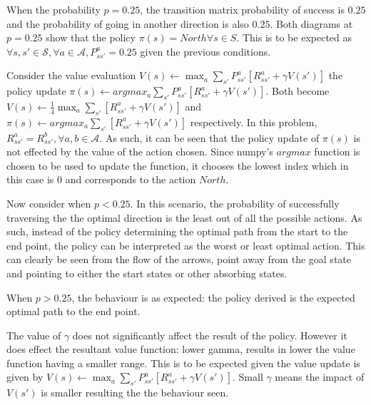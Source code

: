 \begin{landscape}
\begin{center}
\begin{tabular}{c || c  c  c}
    \end{tabular}        
\end{center}
\end{landscape}
\break

When the probability $p = 0.25$, the transition matrix probability
of success is $0.25$ and the probability of going in another direction
is also $0.25$.
Both diagrams at $p = 0.25$ show that the policy $\pi(s) = North \forall s \in S$.
This is to be expected as
$ \forall s, s' \in \mathcal{S}, \forall a \in \mathcal{A}, P^a_{ss'} = 0.25$ given 
the previous conditions. 

Consider the value evaluation 
$V(s) \leftarrow \max_a \sum_{s'} P^a_{ss'}[R^a_{ss'} + \gamma V(s')]$
the policy update $\pi(s) \leftarrow argmax_a \sum_{s'} P^a_{ss'}[R^a_{ss'} + \gamma V(s')]$.
Both become $V(s) \leftarrow \frac{1}{4}\max_a \sum_{s'} [R^a_{ss'} + \gamma V(s')]$
and $\pi(s) \leftarrow argmax_a \sum_{s'} [R^a_{ss'} + \gamma V(s')]$
respectively.
In this problem, $R^a_{ss'} = R^b_{ss'}, \forall a, b \in \mathcal{A}$. 
As such, it can be seen that the policy update of $\pi(s)$ is 
not effected by the value of the action chosen. Since numpy's
$argmax$ function is chosen to be used to update the function, 
it chooses the lowest index which in this case is $0$ and corresponds
to the action $North$. 

Now consider when $p < 0.25$.
In this scenario, the probability of successfully traversing the the
optimal direction is the least out of all the possible actions.
As such, instead of the policy determining the optimal path from the
start to the end point, the policy can be interpreted as the worst
or least optimal action. This can clearly be seen from the flow 
of the arrows, point away from the goal state and pointing to either
the start states or other absorbing states. 

When $p > 0.25$, the behaviour is as expected: the policy derived
is the expected optimal path to the end point.

The value of $\gamma$ does not significantly affect the 
result of the policy.
However it does effect the resultant value function:
lower gamma, results in lower the value function having a smaller 
range. This is to be expected given the value update is given by 
$V(s) \leftarrow \max_a \sum_{s'} P^a_{ss'}[R^a_{ss'} + \gamma V(s')]$.
Small $\gamma$ means the impact of $V(s')$ is smaller resulting the 
the behaviour seen.
